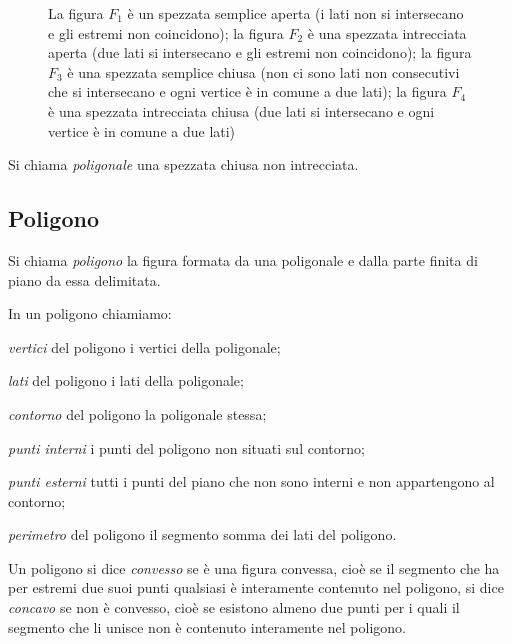 \begin{inaccessibleblock}
 \begin{figure}[htb]
\centering
\caption{La figura \(F_1\) è un spezzata semplice aperta (i lati non si 
intersecano e gli estremi non coincidono); la figura \(F_2\) è una 
spezzata intrecciata aperta (due lati si intersecano e gli estremi 
non coincidono); la figura \(F_3\) è una spezzata semplice chiusa (non 
ci sono lati non consecutivi che si intersecano e ogni vertice è in 
comune a due lati); la figura \(F_4\) è una spezzata intrecciata chiusa 
(due lati si intersecano e ogni vertice è in comune a due lati)}
\end{figure}
\end{inaccessibleblock}

\begin{definizione}
Si chiama \emph{poligonale} una spezzata chiusa non intrecciata.
\end{definizione}

\subsection{Poligono}

\begin{definizione}
Si chiama \emph{poligono} la figura formata da una poligonale e dalla 
parte finita di piano da essa delimitata.
\end{definizione}

\begin{definizione}
In un poligono chiamiamo:
\begin{itemize*}
\item \emph{vertici} del poligono i vertici della poligonale;
\item \emph{lati} del poligono i lati della poligonale;
\item \emph{contorno} del poligono la poligonale stessa;
\item \emph{punti interni} i punti del poligono non situati sul 
contorno;
\item \emph{punti esterni} tutti i punti del piano che non sono 
interni e non appartengono al contorno;
\item \emph{perimetro} del poligono il segmento somma dei lati del 
poligono.
\end{itemize*}
\end{definizione}

\begin{definizione}
Un poligono si dice \emph{convesso} se è una figura convessa, cioè se 
il segmento che ha per estremi due suoi punti qualsiasi è interamente 
contenuto nel poligono, si dice \emph{concavo} se non è convesso, 
cioè se esistono almeno due punti per i quali il segmento che li 
unisce non è contenuto interamente nel poligono.
\end{definizione}


